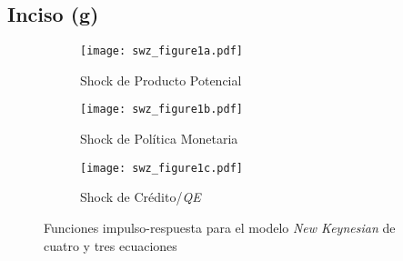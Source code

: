 \documentclass[../../entrega.tex]{subfiles}
\begin{document}
\subsection{Inciso (g)}
\begin{figure}[!htb]
	\centering
	\begin{subfigure}[b]{0.49\textwidth}
		\centering
		\texttt{[image: swz\_figure1a.pdf]}
		\caption{Shock de Producto Potencial}
		\label{fig:swz1a}
	\end{subfigure}
	\hfill
	\begin{subfigure}[b]{0.49\textwidth}
		\centering
		\texttt{[image: swz\_figure1b.pdf]}
		\caption{Shock de Política Monetaria}
		\label{fig:swz1b}
	\end{subfigure}
	\begin{subfigure}[b]{0.49\textwidth}
		\centering
		\texttt{[image: swz\_figure1c.pdf]}
		\caption{Shock de Crédito/\emph{QE}}
		\label{fig:swz1c}
	\end{subfigure}
	\caption{Funciones impulso-respuesta para el modelo \emph{New Keynesian} de cuatro y tres ecuaciones}
	\label{fig:swz1}
\end{figure}
\end{document}
